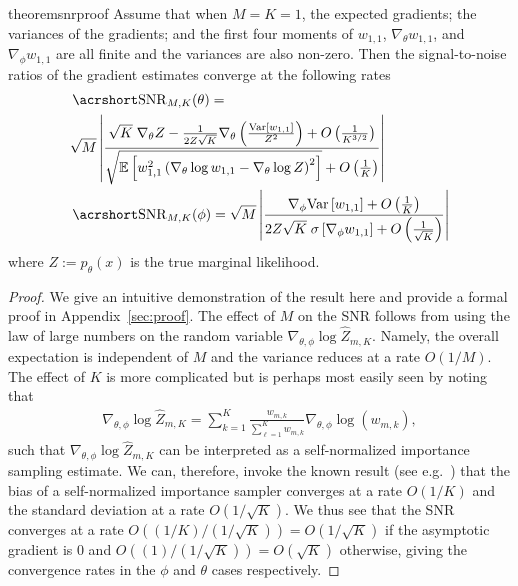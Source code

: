 \begin{restatable}{theorem}{snrproof}
	\label{the:snr}
Assume that when $M=K=1$, the expected gradients; the variances of the gradients; and the 
first four moments of  $w_{1,1}$, $\nabla_{\theta} w_{1,1}$, and 
$\nabla_{\phi} w_{1,1}$ are all finite and the variances are
also non-zero.
Then the signal-to-noise ratios of the gradient estimates converge at the following rates
\begin{align}
&\SNR_{M,K} (\theta) = 
	\label{eq:snr_theta} \\
&\sqrt{M}\left|\frac{ \sqrt{K} \; 
	\nabla_{\theta} Z -\frac{1}{2Z\sqrt{K}}\nabla_{\theta} \left(\frac{\textnormal{Var} \left[w_{1,1}\right]}{Z^2}\right)+ O\left(\frac{1}{K^{3/2}}\right) }
{\sqrt{\E \left[w_{1,1}^2\left(\nabla_{\theta} \log w_{1,1}-\nabla_{\theta} \log Z\right)^2\right]} + O\left(\frac{1}{K}\right)}\right| \nonumber \\
\label{eq:snr_phi}
& \SNR_{M,K} (\phi) =\sqrt{M} \left|\frac{
	\nabla_{\phi} \textnormal{Var} \left[w_{1,1}\right] + O\left(\frac{1}{K}\right) }
{2 Z\sqrt{K} \; \sigma\left[\nabla_{\phi} w_{1,1}\right] +O\left(\frac{1}{\sqrt{K}}\right)}\right|
\end{align}
where $Z := p_{\theta}(x)$ is the true marginal likelihood.
\end{restatable}
\begin{proof}
    We give an intuitive demonstration
	of the result here and provide a formal proof in Appendix~\ref{sec:proof}.
	The effect of $M$ on the \gls{SNR} follows from
	using the law of large
	numbers on the random variable $\nabla_{\theta, \phi} \log \hat{Z}_{m,K}$.  Namely, the 
	overall expectation is independent of $M$ and
	the variance reduces at a rate $O(1/M)$.  
	The effect of $K$ is more complicated but
	is perhaps most easily seen by noting that~\cite{burda2016importance}
	\begin{align*}
	\nabla_{\theta, \phi} \log \hat{Z}_{m,K}
	= \sum_{k=1}^{K} \frac{w_{m,k}^{}}{\sum_{\ell=1}^{K} w_{m,k}^{}} 
	\nabla_{\theta, \phi} \log \left(w_{m,k}^{}\right),
	\end{align*}
	such that $\nabla_{\theta, \phi} \log \hat{Z}_{m,K}$ can be interpreted as a self-normalized importance sampling
	estimate.  We can, therefore, invoke the known result (see e.g.~\citet{hesterberg1988advances}) 
	that the bias of a self-normalized
	importance sampler converges at a rate $O(1/K)$ and the standard deviation at
	a rate $O(1/\sqrt{K})$.  We thus see that the \gls{SNR} converges at a rate $O((1/K)/(1/\sqrt{K}))
	=O(1/\sqrt{K})$ if the asymptotic gradient is $0$ and $O((1)/(1/\sqrt{K}))=O(\sqrt{K})$
	otherwise, giving the convergence rates in the $\phi$ and $\theta$ cases respectively.
	\vspace{-8pt}
\end{proof}

